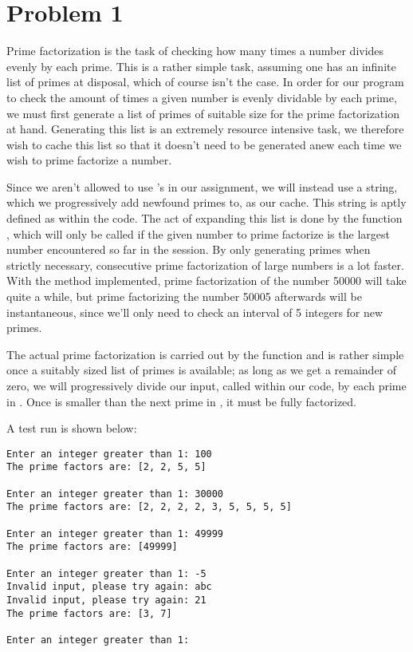 \section*{Problem 1}
Prime factorization is the task of checking how many times a number divides evenly by each prime.
This is a rather simple task, assuming one has an infinite list of primes at disposal, which of course isn't the case.
In order for our program to check the amount of times a given number is evenly dividable by each prime, we must first generate a list of primes of suitable size for the prime factorization at hand. Generating this list is an extremely resource intensive task, we therefore wish to cache this list so that it doesn't need to be generated anew each time we wish to prime factorize a number.

Since we aren't allowed to use 's in our assignment, we will instead use a string, which we progressively add newfound primes to, as our cache. This string is aptly defined as  within the code.
The act of expanding this list is done by the function , which will only be called if the given number to prime factorize is the largest number encountered so far in the session.
By only generating primes when strictly necessary, consecutive prime factorization of large numbers is a lot faster.
With the method implemented, prime factorization of the number 50000 will take quite a while, but prime factorizing the number 50005 afterwards will be instantaneous, since we'll only need to check an interval of 5 integers for new primes.

The actual prime factorization is carried out by the function  and is rather simple once a suitably sized list of primes is available; as long as we get a remainder of zero, we will progressively divide our input, called  within our code, by each prime in . Once  is smaller than the next prime in , it must be fully factorized.

A test run is shown below:
\begin{Verbatim}
Enter an integer greater than 1: 100
The prime factors are: [2, 2, 5, 5]

Enter an integer greater than 1: 30000
The prime factors are: [2, 2, 2, 2, 3, 5, 5, 5, 5]

Enter an integer greater than 1: 49999
The prime factors are: [49999]

Enter an integer greater than 1: -5
Invalid input, please try again: abc
Invalid input, please try again: 21
The prime factors are: [3, 7]

Enter an integer greater than 1: 
\end{Verbatim}